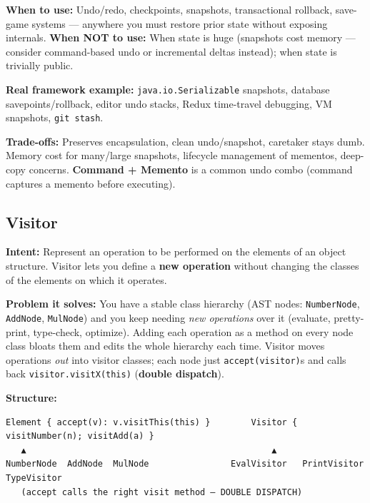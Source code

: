 \documentclass[11pt]{article}
\begin{document}
\textbf{When to use:} Undo/redo, checkpoints, snapshots, transactional rollback, save-game systems --- anywhere you must restore prior state without exposing internals. \textbf{When NOT to use:} When state is huge (snapshots cost memory --- consider command-based undo or incremental deltas instead); when state is trivially public.

\textbf{Real framework example:} \texttt{java.io.Serializable} snapshots, database savepoints/rollback, editor undo stacks, Redux time-travel debugging, VM snapshots, \texttt{git\ stash}.

\textbf{Trade-offs:} Preserves encapsulation, clean undo/snapshot, caretaker stays dumb. Memory cost for many/large snapshots, lifecycle management of mementos, deep-copy concerns. \textbf{Command + Memento} is a common undo combo (command captures a memento before executing).

\subsection{Visitor}\label{visitor}

\textbf{Intent:} Represent an operation to be performed on the elements of an object structure. Visitor lets you define a \textbf{new operation} without changing the classes of the elements on which it operates.

\textbf{Problem it solves:} You have a stable class hierarchy (AST nodes: \texttt{NumberNode}, \texttt{AddNode}, \texttt{MulNode}) and you keep needing \emph{new operations} over it (evaluate, pretty-print, type-check, optimize). Adding each operation as a method on every node class bloats them and edits the whole hierarchy each time. Visitor moves operations \emph{out} into visitor classes; each node just \texttt{accept(visitor)}s and calls back \texttt{visitor.visitX(this)} (\textbf{double dispatch}).

\textbf{Structure:}

\setcodelang{}

\begin{verbatim}
Element { accept(v): v.visitThis(this) }        Visitor { visitNumber(n); visitAdd(a) }
   ▲                                                ▲
NumberNode  AddNode  MulNode                EvalVisitor   PrintVisitor   TypeVisitor
   (accept calls the right visit method — DOUBLE DISPATCH)
\end{verbatim}

\end{document}
